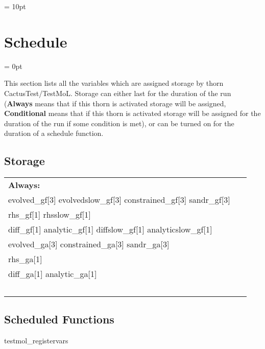 \vspace{5mm}\parskip = 10pt 

\section{Schedule} 


\parskip = 0pt


\noindent This section lists all the variables which are assigned storage by thorn CactusTest/TestMoL.  Storage can either last for the duration of the run ({\bf Always} means that if this thorn is activated storage will be assigned, {\bf Conditional} means that if this thorn is activated storage will be assigned for the duration of the run if some condition is met), or can be turned on for the duration of a schedule function.


\subsection*{Storage}

\hspace{5mm}

 \begin{tabular*}{160mm}{ll} 

{\bf Always:}&  ~ \\ 
 evolved\_gf[3] evolvedslow\_gf[3] constrained\_gf[3] sandr\_gf[3] & ~\\ 
 rhs\_gf[1] rhsslow\_gf[1] & ~\\ 
 diff\_gf[1] analytic\_gf[1] diffslow\_gf[1] analyticslow\_gf[1] & ~\\ 
 evolved\_ga[3] constrained\_ga[3] sandr\_ga[3] & ~\\ 
 rhs\_ga[1] & ~\\ 
 diff\_ga[1] analytic\_ga[1] & ~\\ 
~ & ~\\ 
\end{tabular*} 


\subsection*{Scheduled Functions}
\vspace{5mm}


\hspace{5mm} testmol\_registervars 

\hspace{5mm}{\it register evolved, rhs variables } 


